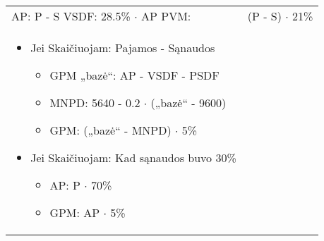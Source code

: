 \begin{tabularx}{15cm}{p{7.5cm}|p{7.5cm}}
 
  AP: P - S
  VSDF: 28.5\% $\cdot$ AP
  PVM: & (P - S) $\cdot$ 21\% \\
  
  \begin{itemize}
  	\item Jei Skaičiuojam: Pajamos - Sąnaudos
	\begin{itemize}
		\item GPM „bazė“: AP - VSDF - PSDF
  		\item MNPD: 5640 - 0.2 $\cdot$ („bazė“ - 9600)
  		\item GPM: („bazė“ - MNPD) $\cdot$ 5\%
	\end{itemize}	  	
  	
  	\item Jei Skaičiuojam: Kad sąnaudos buvo 30\%
  	\begin{itemize}
  		\item AP: P $\cdot$ 70\%
  		\item GPM: AP $\cdot$ 5\%
  	\end{itemize}
  \end{itemize}

  
  
\end{tabularx}
